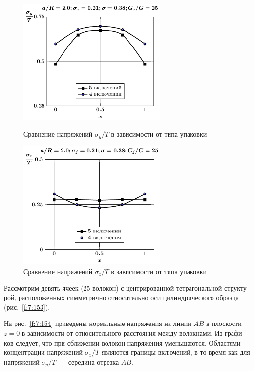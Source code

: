 \begin{russian}
\begin{figure}[h!]
\centering\footnotesize
\parbox[b]{7.5cm}{\centering\includegraphics[width=7.4cm]{inc5-4-a20-g25-z0-sig_y.pdf}
\caption{Сравнение напряжений $\sigma_y/T$ в зависимости от типа упаковки
\label{f:7:144}}}\hfil\hfil
\parbox[b]{7.5cm}{\centering\includegraphics[width=7.4cm]{inc5-4-a20-g25-z0-sig_z.pdf}
\caption{Сравнение напряжений $\sigma_z/T$ в зависимости от типа упаковки
\label{f:7:145}}}
\end{figure}

Рассмотрим девять ячеек (25 волокон) с центрированной тетрагональной структурой, расположенных симметрично относительно оси цилиндрического образца (рис.~\ref{f:7:153}).

На рис.~\ref{f:7:154} приведены нормальные напряжения на линии $AB$ в плоскости $z=0$ в зависимости от относительного расстояния между волокнами. Из графиков следует, что при сближении волокон напряжения уменьшаются. Областями концентрации напряжений $\sigma_x/T$ являются границы включений, в то время как для напряжений $\sigma_y/T$~--- середина отрезка $AB$.


\end{russian}
